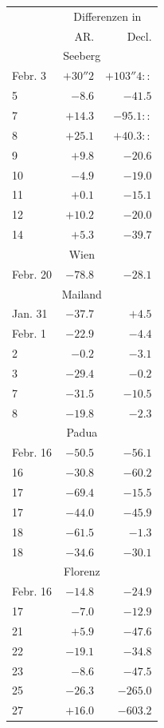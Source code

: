 \begin{center}
\begin{tabular}{l|r|r}
& \multicolumn{2}{c}{Differenzen in} \\
& AR. & Decl. \\
\multicolumn{3}{c}{Seeberg} \\
Febr. 3 & $+30''2$ & $+103''4\!::$ \\
5 & $-8.6$ & $-41.5$ \\
7 & $+14.3$ & $-95.1\!::$ \\
8 & $+25.1$ & $+40.3\!::$ \\
9 & $+9.8$ & $-20.6$ \\
10 & $-4.9$ & $-19.0$ \\
11 & $+0.1$ & $-15.1$ \\
12 & $+10.2$ & $-20.0$ \\
14 & $+5.3$ & $-39.7$ \\
\multicolumn{3}{c}{Wien} \\
Febr. 20 & $-78.8$ & $-28.1$ \\
\multicolumn{3}{c}{Mailand} \\
Jan. 31 & $-37.7$ & $+4.5$ \\
Febr. 1 & $-22.9$ & $-4.4$ \\
2 & $-0.2$ & $-3.1$ \\
3 & $-29.4$ & $-0.2$ \\
7 & $-31.5$ & $-10.5$ \\
8 & $-19.8$ & $-2.3$ \\
\multicolumn{3}{c}{Padua} \\
Febr. 16 & $-50.5$ & $-56.1$ \\
16 & $-30.8$ & $-60.2$ \\
17 & $-69.4$ & $-15.5$ \\
17 & $-44.0$ & $-45.9$ \\
18 & $-61.5$ & $-1.3$ \\
18 & $-34.6$ & $-30.1$ \\
\multicolumn{3}{c}{Florenz} \\
Febr. 16 & $-14.8$ & $-24.9$ \\
17 & $-7.0$ & $-12.9$ \\
21 & $+5.9$ & $-47.6$ \\
22 & $-19.1$ & $-34.8$ \\
23 & $-8.6$ & $-47.5$ \\
25 & $-26.3$ & $-265.0$ \\
27 & $+16.0$ & $-603.2$ \\
\end{tabular}
\end{center}
